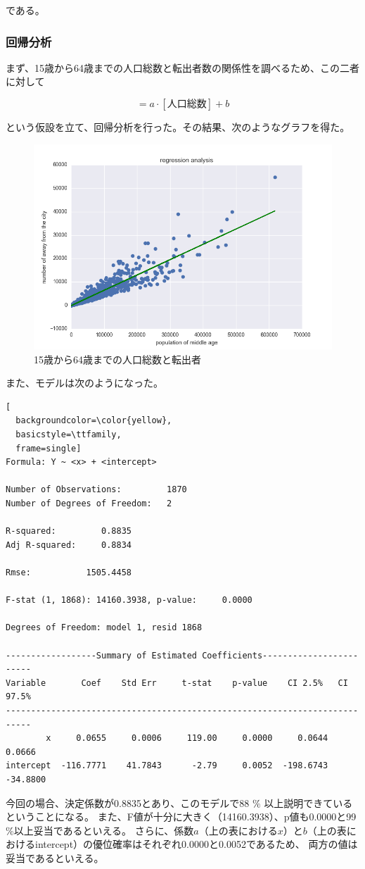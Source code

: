 \documentclass[a4paper,xelatex,ja=standard,jafont=hiragino-pron, 10pt]{bxjsarticle}
\begin{document}
である。

\subsubsection{回帰分析}

まず、15歳から64歳までの人口総数と転出者数の関係性を調べるため、この二者に対して

\begin{equation}
  [転出者数] = a \cdot [人口総数] + b
\end{equation}

という仮設を立て、回帰分析を行った。その結果、次のようなグラフを得た。

\begin{figure}[ht]
  \centering
  \includegraphics[clip, width=12.0cm]{../data/picture/regression_ma.png}
  \caption{15歳から64歳までの人口総数と転出者}
  \label{reg_ma}
\end{figure}

また、モデルは次のようになった。

\begin{lstlisting}[
  backgroundcolor=\color{yellow},
  basicstyle=\ttfamily,
  frame=single]
Formula: Y ~ <x> + <intercept>

Number of Observations:         1870
Number of Degrees of Freedom:   2

R-squared:         0.8835
Adj R-squared:     0.8834

Rmse:           1505.4458

F-stat (1, 1868): 14160.3938, p-value:     0.0000

Degrees of Freedom: model 1, resid 1868

------------------Summary of Estimated Coefficients------------------------
Variable       Coef    Std Err     t-stat    p-value    CI 2.5%   CI 97.5%
---------------------------------------------------------------------------
        x     0.0655     0.0006     119.00     0.0000     0.0644     0.0666
intercept  -116.7771    41.7843      -2.79     0.0052  -198.6743   -34.8800
\end{lstlisting}

今回の場合、決定係数が0.8835とあり、このモデルで88 $\%$ 以上説明できているということになる。
また、F値が十分に大きく（14160.3938）、p値も0.0000と99$\%$以上妥当であるといえる。
さらに、係数$a$（上の表における$x$）と$b$（上の表におけるintercept）の優位確率はそれぞれ0.0000と0.0052であるため、
両方の値は妥当であるといえる。
\end{document}
